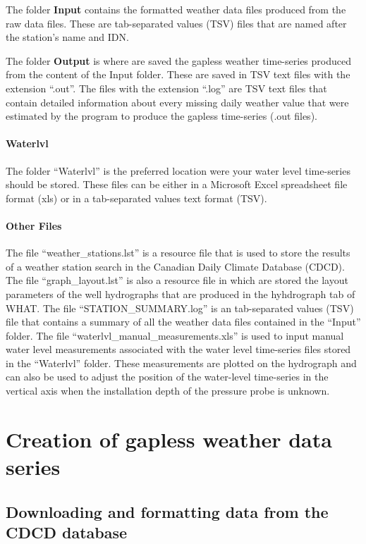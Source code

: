 \documentclass[12pt, letterpaper, fleqn]{report}
\begin{document}
The folder \textbf{Input} contains the formatted weather data files produced from the raw data files. These are tab-separated values (TSV) files that are named after the station's name and IDN.

The folder \textbf{Output} is where are saved the gapless weather time-series produced from the content of the Input folder. These are saved in TSV text files with the extension ``.out''. The files with the extension ``.log'' are TSV text files that contain detailed information about every missing daily weather value that were estimated by the program to produce the gapless time-series (.out files).

\paragraph{Waterlvl} The folder ``Waterlvl'' is the preferred location were your water level time-series should be stored. These files can be  either in a Microsoft Excel spreadsheet file format (xls) or in a tab-separated values text format (TSV).

\paragraph{Other Files}The file ``weather\_stations.lst'' is a resource file that is used to store the results of a weather station search in the Canadian Daily Climate Database (CDCD). The file ``graph\_layout.lst'' is also a resource file in which are stored the layout parameters of the well hydrographs that are produced in the hyhdrograph tab of WHAT. The file ``STATION\_SUMMARY.log'' is an tab-separated values (TSV) file that contains a summary of all the weather data files contained in the ``Input'' folder. The file ``waterlvl\_manual\_measurements.xls'' is used to input manual water level measurements associated with the water level time-series files stored in the ``Waterlvl'' folder. These measurements are plotted on the hydrograph and can also be used to adjust the position of the water-level time-series in the vertical axis when the installation depth of the pressure probe is unknown.

\FloatBarrier

\section{Creation of gapless weather data series}

\subsection{Downloading and formatting data from the CDCD database}
\end{document}
